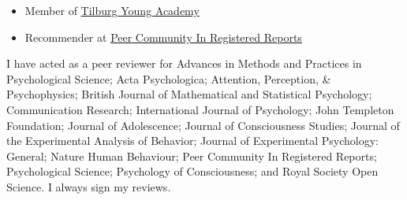\documentclass[12pt, a4paper]{article}
\begin{document}
\begin{itemize}
  \item Member of \href{https://www.tilburguniversity.edu/research/tilburg-young-academy/members}{Tilburg Young Academy}
  \item Recommender at \href{https://rr.peercommunityin.org/public/user_public_page?userId=1570}{Peer Community In Registered Reports}
\end{itemize}

I have acted as a peer reviewer for Advances in Methods and Practices in Psychological Science; Acta Psychologica; Attention, Perception, \& Psychophysics; British Journal of Mathematical and Statistical Psychology; Communication Research; International Journal of Psychology; John Templeton Foundation; Journal of Adolescence; Journal of Consciousness Studies; Journal of the Experimental Analysis of Behavior; Journal of Experimental Psychology: General; Nature Human Behaviour; Peer Community In Registered Reports; Psychological Science; Psychology of Consciousness; and Royal Society Open Science. I always sign my reviews.

\vfill{}
\end{document}
